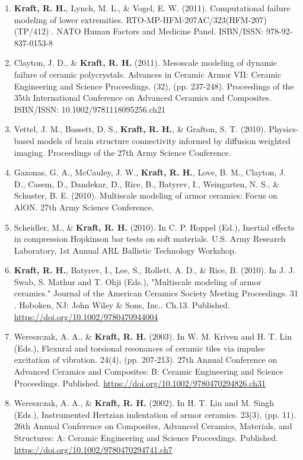 \documentclass[a4paper,10pt]{article}
\begin{document}
\begin{enumerate}
  \item \textbf{\textbf{Kraft,} R. H.}, Lynch, M. L., \&
 Vogel, E. W. (2011). Computational failure modeling of lower extremities. RTO-MP-HFM-207AC/323(HFM-207)(TP/412) . NATO Human Factors and Medicine Panel. ISBN/ISSN: 978-92-837-0153-8
  \item Clayton, J. D., \&
 \textbf{\textbf{Kraft,} R. H.} (2011). Mesoscale modeling of dynamic failure of ceramic polycrystals. Advances in Ceramic Armor VII: Ceramic Engineering and Science Proceedings. (32), (pp. 237-248). Proceedings of the 35th International Conference on Advanced Ceramics and Composites. ISBN/ISSN: 10.1002/9781118095256.ch21
  \item Vettel, J. M., Bassett, D. S., \textbf{\textbf{Kraft,} R. H.}, \&
 Grafton, S. T. (2010). Physics-based models of brain structure connectivity informed by diffusion weighted imaging. Proceedings of the 27th Army Science Conference.
  \item Gazonas, G. A., McCauley, J. W., \textbf{\textbf{Kraft,} R. H.}, Love, B. M., Clayton, J. D., Casem, D., Dandekar, D., Rice, B., Batyrev, I., Weingarten, N. S., \&
 Schuster, B. E. (2010). Multiscale modeling of armor ceramics: Focus on AlON. 27th Army Science Conference.
  \item Scheidler, M., \&
 \textbf{\textbf{Kraft,} R. H.} (2010). In C. P. Hoppel (Ed.), Inertial effects in compression Hopkinson bar tests on soft materials. U.S. Army Research Laboratory, 1st Annual ARL Ballistic Technology Workshop.
  \item \textbf{\textbf{Kraft,} R. H.}, Batyrev, I., Lee, S., Rollett, A. D., \&
 Rice, B. (2010). In J. J. Swab, S. Mathur and T. Ohji (Eds.), "Multiscale modeling of armor ceramics." Journal of the American Ceramics Society Meeting Proceedings. 31 . Hoboken, NJ: John Wiley \&
 Sons, Inc..  
Ch.13. Published. \url{https://doi.org/10.1002/9780470944004}
  \item Wereszczak, A. A., \&
 \textbf{\textbf{Kraft,} R. H.} (2003). In W. M. Kriven and H. T. Lin (Eds.), Flexural and torsional resonances of ceramic tiles via impulse excitation of vibration. 24(4), (pp. 207-213). 27th Annual Conference on Advanced Ceramics and Composites: B: Ceramic Engineering and Science Proceedings. Published. \url{https://doi.org/10.1002/9780470294826.ch31}
  \item Wereszczak, A. A., \&
 \textbf{\textbf{Kraft,} R. H.} (2002). In H. T. Lin and M. Singh (Eds.), Instrumented Hertzian indentation of armor ceramics. 23(3), (pp. 11). 26th Annual Conference on Composites, Advanced Ceramics, Materials, and Structures: A: Ceramic Engineering and Science Proceedings. Published. \url{https://doi.org/10.1002/9780470294741.ch7}

    \end{enumerate}
    
\end{document}
